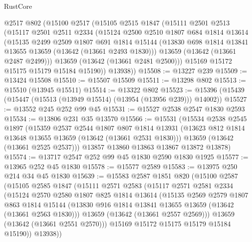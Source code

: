 \begin{lexlean}{RustCore}
\begin{coremodule}
    @2517
    @802
    (@15100
      @2517
      (@15105
        @2515
        @1847
        (@15111
          @2501
          @2513
          (@15117
            @2501
            @2511
            @2334
            (@15124
              @2500
              @2510
              @1807
              @684
              @1814
              @13614
              (@15135
                @2499
                @2509
                @1807
                @691
                @1814
                @15144
                (@13830 @698 @1814 @13841 @13655 @13659 (@13642 (@13661 @2493 @1830)))
                @13659
                (@13642 (@13661 @2487 @2499)))
              @13659
              (@13642 (@13661 @2481 @2500)))
            @15169
            @15172
            @15175
            @15179
            @15184
            @15190))
        @13938))
@15508 := @13227 @239
@15509 := @13424 @15508
@15510 := @15507 @15509
@15511 := @13298 @802
@15513 := @15510 (@13945 @15511)
@15514 := @13322 @802
@15523 := @15396 (@15439 (@15447 (@15513 (@13949 @15514) (@13954 (@13956 @239))) @14002))
@15527 := @13552 @245 @252 @99 @45
@15531 := @15527 @2538 @2547 @1830 @2593
@15534 := @13806 @231 @35 @13570
@15566 := @15531
    (@15534
      @2538
      @2545
      @1897
      (@15359
        @2537
        @2544
        @1807
        @807
        @1814
        @13931
        (@13623 @812 @1814 @13648 @13655 @13659 (@13642 (@13661 @2531 @1830)))
        @13659
        (@13642 (@13661 @2525 @2537)))
      @13857
      @13860
      @13863
      @13867
      @13872
      @13878)
@15574 := @13717 @2547 @252 @99 @45 @1830 @2590 @1830 @1925
@15577 := @13965 @252 @45 @1830
@15578 := @15577 @2589
@15583 := @13975 @250 @214 @34 @45 @1830
@15639 := @15583
    @2587
    @1851
    @820
    (@15100
      @2587
      (@15105
        @2585
        @1847
        (@15111
          @2571
          @2583
          (@15117
            @2571
            @2581
            @2334
            (@15124
              @2570
              @2580
              @1807
              @825
              @1814
              @13614
              (@15135
                @2569
                @2579
                @1807
                @863
                @1814
                @15144
                (@13830 @916 @1814 @13841 @13655 @13659 (@13642 (@13661 @2563 @1830)))
                @13659
                (@13642 (@13661 @2557 @2569)))
              @13659
              (@13642 (@13661 @2551 @2570)))
            @15169
            @15172
            @15175
            @15179
            @15184
            @15190))
        @13938))

\end{coremodule}
\end{lexlean}
